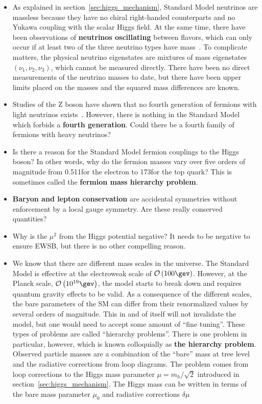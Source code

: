 \begin{itemize}
	\item As explained in section~\ref{sec:higgs_mechanism}, Standard Model neutrinos are massless because they have no chiral right-handed counterparts and no Yukawa coupling with the scalar Higgs field. At the same time, there have been observations of \textbf{neutrinos oscillating} between flavors, which can only occur if at least two of the three neutrino types have mass~\cite{Abe:2008aa,Abe:2014ugx,Agafonova:2014ptn,Agashe:2014kda,PhysRevLett.81.1158}. To complicate matters, the physical neutrino eigenstates are mixtures of mass eigenstates $\left(\nu_{1},\nu_{2},\nu_{3}\right)$, which cannot be measured directly. There have been no direct measurements of the neutrino masses to date, but there have been upper limits placed on the masses and the squared mass differences are known.
	\item Studies of the Z boson have shown that no fourth generation of fermions with light neutrinos exists~\cite{DECAMP1990399}. However, there is nothing in the Standard Model which forbids a \textbf{fourth generation}. Could there be a fourth family of fermions with heavy neutrinos?
	\item Is there a reason for the Standard Model fermion couplings to the Higgs boson? In other words, why do the fermion masses vary over five orders of magnitude from 0.511\mev for the electron to 173\gev for the top quark? This is sometimes called the \textbf{fermion mass hierarchy problem}.
	\item \textbf{Baryon and lepton conservation} are accidental symmetries without enforcement by a local gauge symmetry. Are these really conserved quantities?
	\item Why is the $\mu^{2}$ from the Higgs potential negative? It needs to be negative to ensure EWSB, but there is no other compelling reason.
	\item We know that there are different mass scales in the universe. The Standard Model is effective at the electroweak scale of $\mathcal{O}\left(\mathrm{100}\gev\right)$. However, at the Planck scale, $\mathcal{O}\left(\mathrm{10^{19}}\gev\right)$, the model starts to break down and requires quantum gravity effects to be valid. As a consequence of the different scales, the bare parameters of the SM can differ from their renormalized values by several orders of magnitude. This in and of itself will not invalidate the model, but one would need to accept some amount of ``fine tuning''. These types of problems are called ``hierarchy problems''. There is one problem in particular, however, which is known colloquially as \textbf{the hierarchy problem}. Observed particle masses are a combination of the ``bare'' mass at tree level and the radiative corrections from loop diagrams. The problem comes from loop corrections to the Higgs mass parameter $\mu=m_{h}/\sqrt{2}$ introduced in section~\ref{sec:higgs_mechanism}. The Higgs mass can be written in terms of the bare mass parameter $\mu_{0}$ and radiative corrections $\delta\mu$

\end{itemize}

